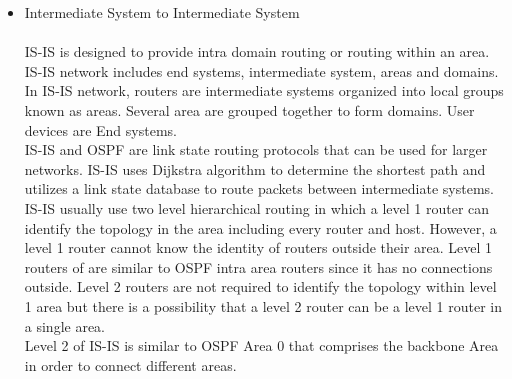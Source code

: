 \documentclass[conference,compsoc]{IEEEtran}
\begin{document}
\begin{itemize}
\item 
Intermediate System to Intermediate System\\\\
IS-IS is designed to provide intra domain routing or routing within an area. IS-IS network includes end systems, intermediate system, areas and domains. In IS-IS network, routers are intermediate systems organized into local groups known as areas. Several area are grouped together to form domains. User devices are End systems. 
\\ IS-IS and OSPF are link state routing protocols that can be used for larger networks. IS-IS uses Dijkstra algorithm to determine the shortest path and utilizes a link state database to route packets between intermediate systems. IS-IS usually use two level hierarchical routing in which a level 1 router can identify the topology in the area including every router and host. However, a level 1 router cannot know the identity of routers outside their area. Level 1 routers of are similar to OSPF intra area routers since it has no connections outside. Level 2 routers are not required to identify the topology within level 1 area but there is a possibility that a level 2 router can be a level 1 router in a single area. 
\\ Level 2 of IS-IS is similar to OSPF Area 0 that comprises the backbone Area in order to connect different areas.
\\
\end{itemize}
\end{document}
